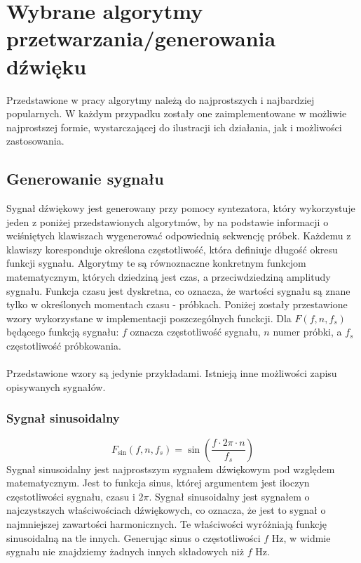 \chapter{Wybrane algorytmy przetwarzania/generowania dźwięku}
Przedstawione w pracy algorytmy należą do najprostszych i najbardziej popularnych. W każdym przypadku zostały one zaimplementowane w możliwie najprostszej formie, wystarczającej do ilustracji ich działania, jak i możliwości zastosowania. 

\section{Generowanie sygnału}
Sygnał dźwiękowy jest generowany przy pomocy syntezatora, który wykorzystuje jeden z poniżej przedstawionych algorytmów, by na podstawie informacji o wciśniętych klawiszach wygenerować odpowiednią sekwencję próbek. Każdemu z klawiszy koresponduje określona częstotliwość, która definiuje długość okresu funkcji sygnału. Algorytmy te są równoznaczne konkretnym funkcjom matematycznym, których dziedziną jest czas, a przeciwdziedziną amplitudy sygnału. Funkcja czasu jest dyskretna, co oznacza, że wartości sygnału są znane tylko w określonych momentach czasu - próbkach. Poniżej zostały przestawione wzory wykorzystane w implementacji poszczególnych funckcji. Dla $F(f, n, f_s)$ będącego funkcją sygnału: $f$ oznacza częstotliwość sygnału, $n$ numer próbki, a $f_s$ częstotliwość próbkowania.
\\\\
Przedstawione wzory są jedynie przykładami. Istnieją inne możliwości zapisu opisywanych sygnałów.

\subsection{Sygnał sinusoidalny}
\newcommand{\Fsin}{F_{\text{sin}}}
\begin{equation}
    \Fsin(f, n, f_s) = \sin\left(\frac{f \cdot 2\pi \cdot n}{f_s}\right)
    \label{eq:sygnał sinusoidalny}
\end{equation}
Sygnał sinusoidalny jest najprostszym sygnałem dźwiękowym pod względem matematycznym. Jest to funkcja sinus, której argumentem jest iloczyn częstotliwości sygnału, czasu i $2\pi$. Sygnał sinusoidalny jest sygnałem o najczystszych właściwościach dźwiękowych, co oznacza, że jest to sygnał o najmniejszej zawartości harmonicznych. Te właściwości wyróżniają funkcję sinusoidalną na tle innych. Generując sinus o częstotliwości $f$ Hz, w widmie sygnału nie znajdziemy żadnych innych składowych niż $f$ Hz.

